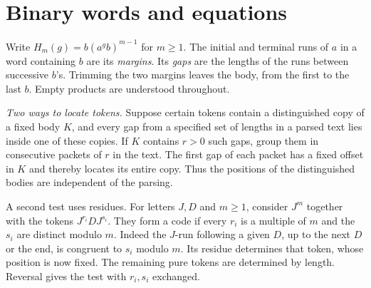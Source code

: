 \documentclass[11pt,a4paper]{article}
\newcommand{\parhead}[1]{\par\smallskip\noindent\textit{#1.}\enspace}
\begin{document}
\section{Binary words and equations}
Write $H_m(g)=b(a^g b)^{m-1}$ for $m\ge1$. The initial and terminal runs of $a$ in a word containing $b$ are its \emph{margins}. Its \emph{gaps} are the lengths of the runs between successive $b$'s. Trimming the two margins leaves the body, from the first to the last $b$. Empty products are understood throughout.
\parhead{Two ways to locate tokens}
Suppose certain tokens contain a distinguished copy of a fixed body $K$, and every gap from a specified set of lengths in a parsed text lies inside one of these copies. If $K$ contains $r>0$ such gaps, group them in consecutive packets of $r$ in the text. The first gap of each packet has a fixed offset in $K$ and thereby locates its entire copy. Thus the positions of the distinguished bodies are independent of the parsing.

A second test uses residues. For letters $J,D$ and $m\ge1$, consider $J^m$ together with the tokens $J^{r_i}D J^{s_i}$. They form a code if every $r_i$ is a multiple of $m$ and the $s_i$ are distinct modulo $m$. Indeed the $J$-run following a given $D$, up to the next $D$ or the end, is congruent to $s_i$ modulo $m$. Its residue determines that token, whose position is now fixed. The remaining pure tokens are determined by length. Reversal gives the test with $r_i,s_i$ exchanged.
\end{document}
